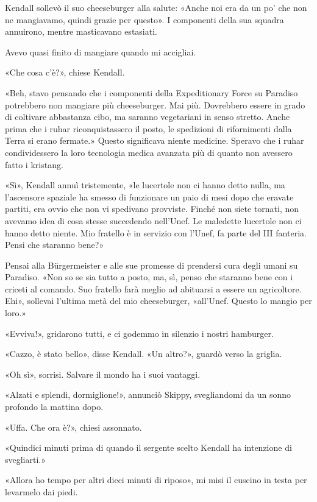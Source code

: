 Kendall sollevò il suo cheeseburger alla salute: «Anche noi era da un
po' che non ne mangiavamo, quindi grazie per questo». I componenti della
sua squadra annuirono, mentre masticavano estasiati.

Avevo quasi finito di mangiare quando mi accigliai.

«Che cosa c'è?», chiese Kendall.

«Beh, stavo pensando che i componenti della Expeditionary Force su
Paradiso potrebbero non mangiare più cheeseburger. Mai più. Dovrebbero
essere in grado di coltivare abbastanza cibo, ma saranno vegetariani in
senso stretto. Anche prima che i ruhar riconquistassero il posto, le
spedizioni di rifornimenti dalla Terra si erano fermate.» Questo
significava niente medicine. Speravo che i ruhar condividessero la loro
tecnologia medica avanzata più di quanto non avessero fatto i kristang.

«Sì», Kendall annuì tristemente, «le lucertole non ci hanno detto nulla,
ma l'ascensore spaziale ha smesso di funzionare un paio di mesi dopo che
eravate partiti, era ovvio che non vi spedivano provviste. Finché non
siete tornati, non avevamo idea di cosa stesse succedendo nell'Unef. Le
maledette lucertole non ci hanno detto niente. Mio fratello è in
servizio con l'Unef, fa parte del III fanteria. Pensi che staranno
bene?»

Pensai alla Bürgermeister e alle sue promesse di prendersi cura degli
umani su Paradiso. «Non so se sia tutto a posto, ma, sì, penso che
staranno bene con i criceti al comando. Suo fratello farà meglio ad
abituarsi a essere un agricoltore. Ehi», sollevai l'ultima metà del mio
cheeseburger, «all'Unef. Questo lo mangio per loro.»

«Evviva!», gridarono tutti, e ci godemmo in silenzio i nostri hamburger.

«Cazzo, è stato bello», disse Kendall. «Un altro?», guardò verso la
griglia.

«Oh sì», sorrisi. Salvare il mondo ha i suoi vantaggi.

\hfill\break

«Alzati e splendi, dormiglione!», annunciò Skippy, svegliandomi da un
sonno profondo la mattina dopo.

«Uffa. Che ora è?», chiesi assonnato.

«Quindici minuti prima di quando il sergente scelto Kendall ha
intenzione di svegliarti.»

«Allora ho tempo per altri dieci minuti di riposo», mi misi il cuscino
in testa per levarmelo dai piedi.

